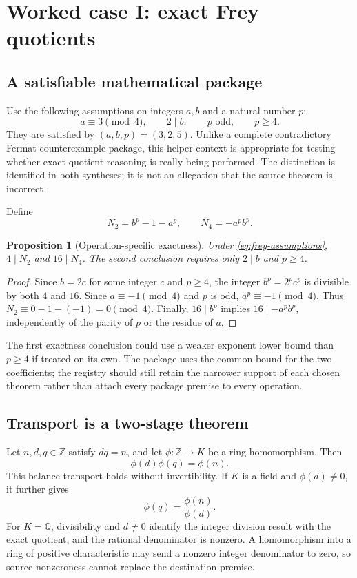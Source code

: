 \documentclass[11pt,a4paper]{article}
\newcommand{\Z}{\mathbb Z}
\newcommand{\Q}{\mathbb Q}
\newtheorem{proposition}[theorem]{Proposition}
\theoremstyle{definition}
\theoremstyle{remark}
\begin{document}
\section{Worked case I: exact Frey quotients}\label{sec:frey}
\subsection{A satisfiable mathematical package}
Use the following assumptions on integers $a,b$ and a natural number $p$:
\begin{equation}\label{eq:frey-assumptions}
 a\equiv3\pmod4,\qquad 2\mid b,\qquad p\text{ odd},\qquad p\ge4.
\end{equation}
They are satisfied by $(a,b,p)=(3,2,5)$. Unlike a complete contradictory Fermat counterexample package, this helper context is appropriate for testing whether exact-quotient reasoning is really being performed. The distinction is identified in both syntheses; it is not an allegation that the source theorem is incorrect \cite{r3a,r3b}.

Define
\[
 N_2=b^p-1-a^p,\qquad N_4=-a^pb^p.
\]
\begin{proposition}[Operation-specific exactness]\label{prop:frey}
Under \eqref{eq:frey-assumptions}, $4\mid N_2$ and $16\mid N_4$. The second conclusion requires only $2\mid b$ and $p\ge4$.
\end{proposition}
\begin{proof}
Since $b=2c$ for some integer $c$ and $p\ge4$, the integer $b^p=2^pc^p$ is divisible by both $4$ and $16$. Since $a\equiv-1\pmod4$ and $p$ is odd, $a^p\equiv-1\pmod4$. Thus $N_2\equiv0-1-(-1)=0\pmod4$. Finally, $16\mid b^p$ implies $16\mid-a^pb^p$, independently of the parity of $p$ or the residue of $a$.
\end{proof}

The first exactness conclusion could use a weaker exponent lower bound than $p\ge4$ if treated on its own. The package uses the common bound for the two coefficients; the registry should still retain the narrower support of each chosen theorem rather than attach every package premise to every operation.

\subsection{Transport is a two-stage theorem}
Let $n,d,q\in\Z$ satisfy $dq=n$, and let $\phi:\Z\to K$ be a ring homomorphism. Then
\[
 \phi(d)\phi(q)=\phi(n).
\]
This balance transport holds without invertibility. If $K$ is a field and $\phi(d)\ne0$, it further gives
\[
 \phi(q)=\frac{\phi(n)}{\phi(d)}.
\]
For $K=\Q$, divisibility and $d\ne0$ identify the integer division result with the exact quotient, and the rational denominator is nonzero. A homomorphism into a ring of positive characteristic may send a nonzero integer denominator to zero, so source nonzeroness cannot replace the destination premise.
\end{document}
